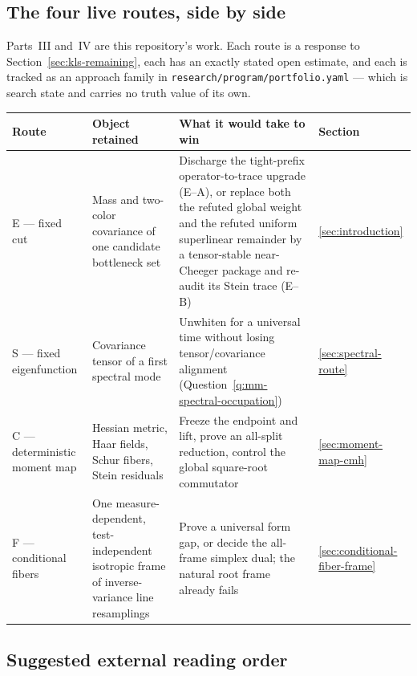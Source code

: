 \documentclass[../../main.tex]{subfiles}
\begin{document}
\subsection{The four live routes, side by side}
\label{subsec:atlas-routes}

Parts~III and~IV are this repository's work. Each route is a response to
Section~\ref{sec:kls-remaining}, each has an exactly stated open estimate, and each is tracked as
an approach family in \texttt{research/program/portfolio.yaml} --- which is search state and
carries no truth value of its own.

\begin{center}
\begin{tabularx}{\textwidth}{@{}>{\raggedright\arraybackslash}p{}>{\raggedright\arraybackslash}p{}Y>{\raggedright\arraybackslash}p{0.14\textwidth}@{}}
\toprule
Route & Object retained & What it would take to win & Section \\
\midrule
E --- fixed cut & Mass and two-color covariance of one candidate bottleneck set &
Discharge the tight-prefix operator-to-trace upgrade (E--A), or replace both the refuted global
weight and the refuted uniform superlinear remainder by a tensor-stable near-Cheeger package and
re-audit its Stein trace (E--B) & \ref{sec:introduction} \\
\addlinespace
S --- fixed eigenfunction & Covariance tensor of a first spectral mode &
Unwhiten for a universal time without losing tensor/covariance alignment
(Question~\ref{q:mm-spectral-occupation}) & \ref{sec:spectral-route} \\
\addlinespace
C --- deterministic moment map & Hessian metric, Haar fields, Schur fibers, Stein residuals &
Freeze the endpoint and lift, prove an all-split reduction, control the global square-root
commutator & \ref{sec:moment-map-cmh} \\
\addlinespace
F --- conditional fibers & One measure-dependent, test-independent isotropic frame of
inverse-variance line resamplings & Prove a universal form gap, or decide the all-frame simplex
dual; the natural root frame already fails & \ref{sec:conditional-fiber-frame} \\
\bottomrule
\end{tabularx}
\end{center}

\subsection{Suggested external reading order}
\label{subsec:atlas-external-reading}
\end{document}
